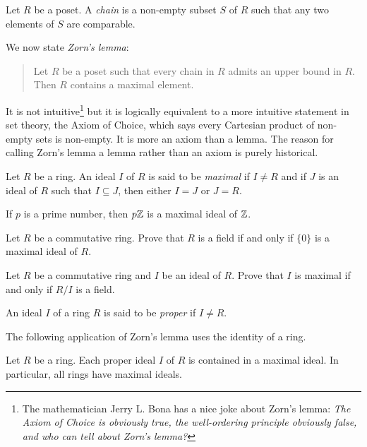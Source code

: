 \begin{definition}
    Let $R$ be a poset. A \emph{chain} is a non-empty subset $S$ of $R$ such that
    any two elements of $S$ are comparable. 
\end{definition}

We now state \emph{Zorn's lemma}:

\begin{quote}
Let $R$ be a poset such that 
every chain in $R$ admits an upper bound in $R$. 
Then $R$ contains a maximal element. 
\end{quote}

It is not intuitive\footnote{The mathematician
Jerry L. Bona has a nice joke about Zorn's lemma: 
\textit{The Axiom of Choice is obviously true, 
the well-ordering principle obviously false, and who can tell about Zorn's lemma?}}
but it is logically equivalent to a more 
intuitive statement in set theory, the Axiom of Choice, 
which says every Cartesian product of non-empty sets is non-empty. 
It is more an axiom than a lemma. 
The reason for calling Zorn’s lemma a lemma rather 
than an axiom is purely historical. 

\begin{definition}
	Let $R$ be a ring. An ideal $I$ of $R$ is said to be \emph{maximal}
	if $I\ne R$ and if $J$ is an ideal of $R$ such that $I\subseteq J$, then 
	either $I=J$ or $J=R$. 
\end{definition}

If $p$ is a prime number, then $p\mathbb{Z}$ is a maximal ideal of $\mathbb{Z}$.

\begin{exercise}
Let $R$ be a commutative ring. Prove that $R$ is a 
field if and only if $\{0\}$ is a maximal ideal of $R$. 	
\end{exercise}

\begin{exercise}
\label{xca:maximal<=>field}
Let $R$ be a commutative ring and $I$ be an ideal of $R$. Prove that $I$ is maximal
if and only if $R/I$ is a field.  	
\end{exercise}

An ideal $I$ of a ring $R$ is said to be \emph{proper}
if $I\ne R$. 

The following application of Zorn's lemma uses 
the identity of a ring.

\begin{theorem}[Krull]
	Let $R$ be a ring. Each proper ideal $I$ of $R$ 
	is contained in a maximal ideal. 
	In particular, all rings have maximal ideals. 	
\end{theorem}

